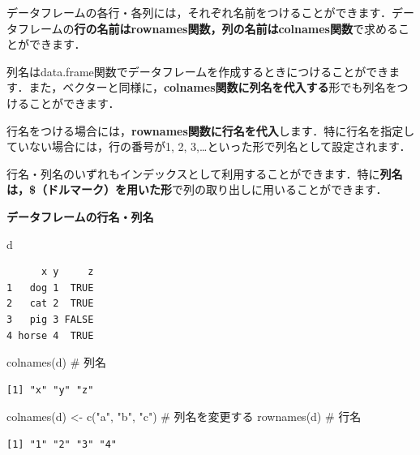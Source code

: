 \documentclass[
  letterpaper,
  DIV=11,
  numbers=noendperiod]{scrreprt}
\newenvironment{Shaded}{\begin{snugshade}}{\end{snugshade}}
\newcommand{\CommentTok}[1]{\textcolor[rgb]{0.37,0.37,0.37}{#1}}
\newcommand{\FunctionTok}[1]{\textcolor[rgb]{0.28,0.35,0.67}{#1}}
\newcommand{\NormalTok}[1]{\textcolor[rgb]{0.00,0.23,0.31}{#1}}
\newcommand{\OtherTok}[1]{\textcolor[rgb]{0.00,0.23,0.31}{#1}}
\newcommand{\StringTok}[1]{\textcolor[rgb]{0.13,0.47,0.30}{#1}}
\begin{document}
データフレームの各行・各列には，それぞれ名前をつけることができます．データフレームの\textbf{行の名前はrownames関数，列の名前はcolnames関数}で求めることができます．

列名はdata.frame関数でデータフレームを作成するときにつけることができます．また，ベクターと同様に，\textbf{colnames関数に列名を代入する}形でも列名をつけることができます．

行名をつける場合には，\textbf{rownames関数に行名を代入}します．特に行名を指定していない場合には，行の番号が1,
2, 3,\ldots といった形で列名として設定されます．

行名・列名のいずれもインデックスとして利用することができます．特に\textbf{列名は，\$（ドルマーク）を用いた形}で列の取り出しに用いることができます．

\textbf{データフレームの行名・列名}

\begin{Shaded}
\begin{Highlighting}[]
\NormalTok{d}
\end{Highlighting}
\end{Shaded}

\begin{verbatim}
      x y     z
1   dog 1  TRUE
2   cat 2  TRUE
3   pig 3 FALSE
4 horse 4  TRUE
\end{verbatim}

\begin{Shaded}
\begin{Highlighting}[]
\FunctionTok{colnames}\NormalTok{(d) }\CommentTok{\# 列名}
\end{Highlighting}
\end{Shaded}

\begin{verbatim}
[1] "x" "y" "z"
\end{verbatim}

\begin{Shaded}
\begin{Highlighting}[]
\FunctionTok{colnames}\NormalTok{(d) }\OtherTok{\textless{}{-}} \FunctionTok{c}\NormalTok{(}\StringTok{"a"}\NormalTok{, }\StringTok{"b"}\NormalTok{, }\StringTok{"c"}\NormalTok{) }\CommentTok{\# 列名を変更する}
\FunctionTok{rownames}\NormalTok{(d) }\CommentTok{\# 行名}
\end{Highlighting}
\end{Shaded}

\begin{verbatim}
[1] "1" "2" "3" "4"
\end{verbatim}
\end{document}
